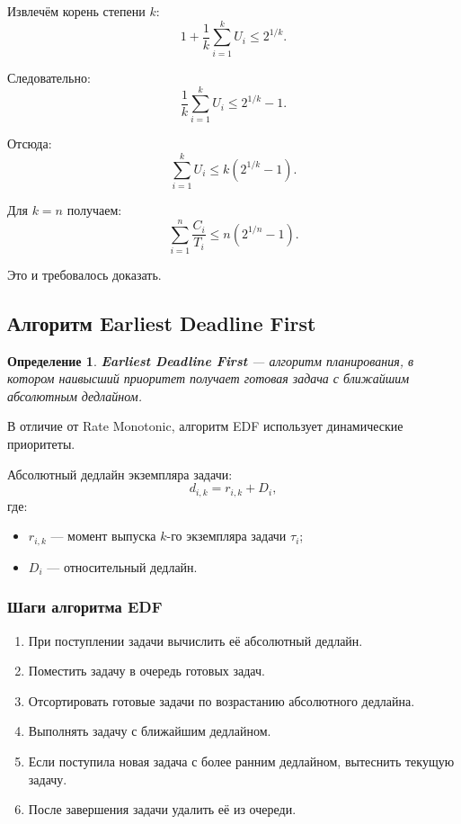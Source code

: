 \documentclass[12pt,a4paper]{article}
\newtheorem{definition}{Определение}
\begin{document}
Извлечём корень степени $k$:
\[
    1 + \frac{1}{k}\sum_{i=1}^{k} U_i
    \leq
    2^{1/k}.
\]

Следовательно:
\[
    \frac{1}{k}\sum_{i=1}^{k} U_i
    \leq
    2^{1/k} - 1.
\]

Отсюда:
\[
    \sum_{i=1}^{k} U_i
    \leq
    k(2^{1/k} - 1).
\]

Для $k=n$ получаем:
\[
    \sum_{i=1}^{n} \frac{C_i}{T_i}
    \leq
    n(2^{1/n} - 1).
\]

Это и требовалось доказать.

\subsection{Алгоритм Earliest Deadline First}

\begin{definition}
\textbf{Earliest Deadline First} --- алгоритм планирования, в котором наивысший приоритет получает готовая задача с ближайшим абсолютным дедлайном.
\end{definition}

В отличие от Rate Monotonic, алгоритм EDF использует динамические приоритеты.

Абсолютный дедлайн экземпляра задачи:
\[
    d_{i,k} = r_{i,k} + D_i,
\]
где:
\begin{itemize}
    \item $r_{i,k}$ --- момент выпуска $k$-го экземпляра задачи $\tau_i$;
    \item $D_i$ --- относительный дедлайн.
\end{itemize}

\subsubsection{Шаги алгоритма EDF}

\begin{enumerate}
    \item При поступлении задачи вычислить её абсолютный дедлайн.
    \item Поместить задачу в очередь готовых задач.
    \item Отсортировать готовые задачи по возрастанию абсолютного дедлайна.
    \item Выполнять задачу с ближайшим дедлайном.
    \item Если поступила новая задача с более ранним дедлайном, вытеснить текущую задачу.
    \item После завершения задачи удалить её из очереди.
\end{enumerate}
\end{document}
